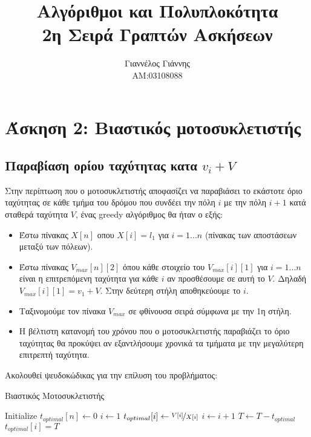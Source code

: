 \documentclass[a4paper,12pt]{report}
\title{ Αλγόριθμοι και Πολυπλοκότητα \\ 2η Σειρά Γραπτών Ασκήσεων}
\author{Γιαννέλος Γιάννης\\ΑΜ:03108088}
\begin{document}
\maketitle

\section*{Άσκηση 2: Βιαστικός μοτοσυκλετιστής}
\subsection*{Παραβίαση ορίου ταχύτητας κατα $v_i+V$}
Στην περίπτωση που ο μοτοσυκλετιστής αποφασίζει να παραβιάσει το εκάστοτε όριο ταχύτητας σε κάθε τμήμα του δρόμου που συνδέει την πόλη $i$ με την πόλη $i+1$ κατά σταθερά ταχύτητα $V$, ένας greedy αλγόριθμος θα ήταν ο εξής:

\begin{itemize}
 \item Έστω πίνακας $X[n]$ οπου $X[i]=l_1$ για $i=1...n$ (πίνακας των αποστάσεων μεταξύ των πόλεων). 
 \item Έστω πίνακας $V_{max}[n][2]$ όπου κάθε στοιχείο του $V_{max}[i][1]$ για $i=1...n$ είναι η επιτρεπόμενη ταχύτητα για κάθε $i$ αν προσθέσουμε σε αυτή το $V$. Δηλαδή $V_{max}[i][1]=v_1+V$. Στην δεύτερη στήλη αποθηκεύουμε το $i$.
 \item Ταξινομούμε τον πίνακα $V_{max}$ σε φθίνουσα σειρά σύμφωνα με την 1η στήλη.
 \item Η βέλτιστη κατανομή του χρόνου που ο μοτοσυκλετιστής παραβιάζει το όριο ταχύτητας θα προκύψει αν εξαντλήσουμε χρονικά τα τμήματα με την μεγαλύτερη επιτρεπτή ταχύτητα.  
\end{itemize}

Ακολουθεί ψευδοκώδικας για την επίλυση του προβλήματος:

\begin{algorithm}
\caption{Βιαστικός Μοτοσυκλετιστής}
\begin{algorithmic}[1]
  \State Initialize $t_{optimal}[n] \gets 0$	
  \State $i \gets 1$
    \State $t_{optimal}[i] \gets \nicefrac{V[i]}{X[i]}$
    \State $i \gets i+1$
    \State $T \gets T-t_{optimal}$
  \EndWhile
  \State $t_{optimal}[i]=T$

\end{algorithmic}
\end{algorithm}
\end{document}
